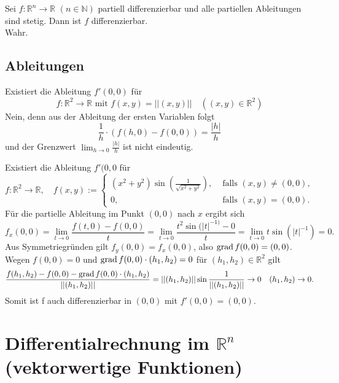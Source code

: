 \documentclass[parskip=full]{scrartcl}
\begin{document}
Sei $f : \mathbb{R}^n \to \mathbb{R}$ $(n \in \mathbb{N})$ partiell differenzierbar und alle partiellen Ableitungen sind stetig.
Dann ist $f$ differenzierbar.\\
Wahr.

\subsection{Ableitungen}
Existiert die Ableitung $f'(0,0)$ für
\begin{displaymath}
  f : \mathbb{R}^2 \to \mathbb{R} \text{ mit } f(x,y) = ||(x,y)|| \quad ((x,y) \in \mathbb{R}^2)
\end{displaymath}
Nein, denn aus der Ableitung der ersten Variablen folgt
\begin{displaymath}
  \frac{1}{h} \cdot (f(h, 0) - f(0,0)) = \frac{|h|}{h}
\end{displaymath}
und der Grenzwert $\lim_{h \to 0} \frac{|h|}{h}$ ist nicht eindeutig.

Existiert die Ableitung $f'(0,0$ für
\begin{displaymath}
  f : \mathbb{R}^2 \to \mathbb{R}, \quad f(x,y) :=
  \begin{cases}
    (x^2 + y^2) \sin\left(\frac{1}{\sqrt{x^2 + y^2}}\right),& \text{ falls } (x,y) \neq (0,0),\\
    0,& \text{ falls } (x,y) = (0,0).
  \end{cases}
\end{displaymath}
Für die partielle Ableitung im Punkt $(0,0)$ nach $x$ ergibt sich
\begin{displaymath}
  f_x(0,0) = \lim_{t \to 0} \frac{f(t,0) - f(0,0)}{t} = \lim_{t \to 0} \frac{t^2 \sin(|t|^{-1)} - 0}{t} = \lim_{t \to 0} t \sin(|t|^{-1}) = 0.
\end{displaymath}
Aus Symmetriegründen gilt $f_y(0,0) = f_x(0,0)$, also $\operatorname{grad} f(0,0) = (0,0)$.
Wegen $f(0,0) = 0$ und $\operatorname{grad} f(0,0) \cdot (h_1, h_2) = 0$ für $(h_1, h_2) \in \mathbb{R}^2$ gilt
\begin{displaymath}
  \frac{f(h_1, h_2) - f(0,0) - \operatorname{grad} f(0,0) \cdot (h_1, h_2)}{||(h_1, h_2)||} = ||(h_1, h_2)|| \sin \frac{1}{||(h_1, h_2)||} \to 0 \quad (h_1, h_2) \to 0.
\end{displaymath}
Somit ist f auch differenzierbar in $(0,0)$ mit $f'(0,0) = (0,0)$.

\section{Differentialrechnung im $\mathbb{R}^n$ (vektorwertige Funktionen)}
\end{document}
